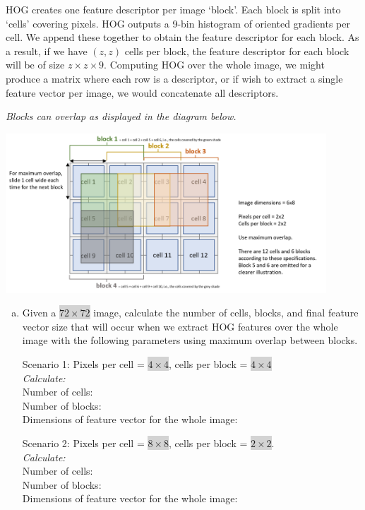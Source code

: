 HOG creates one feature descriptor per image `block'. Each block is split into `cells' covering pixels. HOG outputs a 9-bin histogram of oriented gradients per cell. We append these together to obtain the feature descriptor for each block. As a result, if we have $(z,z)$ cells per block, the feature descriptor for each block will be of size $z \times z \times 9$. Computing HOG over the whole image, we might produce a matrix where each row is a descriptor, or if wish to extract a single feature vector per image, we would concatenate all descriptors.

\emph{Blocks can overlap as displayed in the diagram below.}
%
\begin{center}
    \includegraphics[clip, trim = {0.2cm, 0.35cm, 0.2cm, 0.2cm}, width=12cm]{hog-diagram.png}
\end{center}


\begin{enumerate}[(a)]
\item Given a \colorbox{lightgray}{$72\times72$} image, calculate the number of cells, blocks, and final feature vector size that will occur when we extract HOG features over the whole image with the following parameters using maximum overlap between blocks.

Scenario 1: Pixels per cell = \colorbox{lightgray}{$4\times4$}, cells per block = \colorbox{lightgray}{$4\times4$} %
\\
\emph{Calculate:}
\\ 
Number of cells: 
\\
Number of blocks: 
\\
Dimensions of feature vector for the whole image: 
\\

\vspace{-0.35cm}

Scenario 2: Pixels per cell = \colorbox{lightgray}{$8\times8$}, cells per block = \colorbox{lightgray}{$2\times2$}.
\\
\emph{Calculate:}
\\ 
Number of cells:
\\
Number of blocks: 
\\
Dimensions of feature vector for the whole image: 
\end{enumerate}
%

